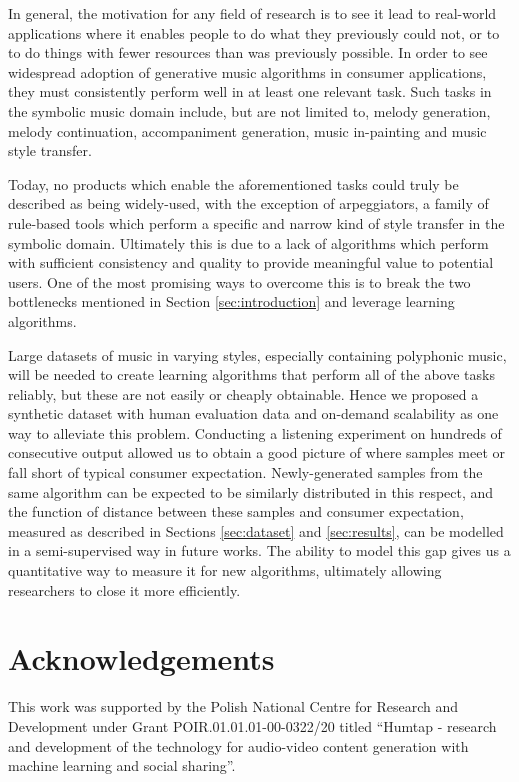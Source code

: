 \documentclass{article}
\begin{document}
In general, the motivation for any field of research is to see it lead to real-world applications where it enables people to do what they previously could not, or to to do things with fewer resources than was previously possible. In order to see widespread adoption of generative music algorithms in consumer applications, they must consistently perform well in at least one relevant task. Such tasks in the symbolic music domain include, but are not limited to, melody generation, melody continuation, accompaniment generation, music in-painting and music style transfer. 

Today, no products which enable the aforementioned tasks could truly be described as being widely-used, with the exception of arpeggiators, a family of rule-based tools which perform a specific and narrow kind of style transfer in the symbolic domain. Ultimately this is due to a lack of algorithms which perform with sufficient consistency and quality to provide meaningful value to potential users. One of the most promising ways to overcome this is to break the two bottlenecks mentioned in Section \ref{sec:introduction} and leverage learning algorithms.

Large datasets of music in varying styles, especially containing polyphonic music, will be needed to create learning algorithms that perform all of the above tasks reliably, but these are not easily or cheaply obtainable. Hence we proposed a synthetic dataset with human evaluation data and on-demand scalability as one way to alleviate this problem. Conducting a listening experiment on hundreds of consecutive output allowed us to obtain a good picture of where samples meet or fall short of typical consumer expectation. Newly-generated samples from the same algorithm can be expected to be similarly distributed in this respect, and the function of distance between these samples and consumer expectation, measured as described in Sections \ref{sec:dataset} and \ref{sec:results}, can be modelled in a semi-supervised way in future works. The ability to model this gap gives us a quantitative way to measure it for new algorithms, ultimately allowing researchers to close it more efficiently.

\section{Acknowledgements}

This work was supported by the Polish National Centre for Research and Development under Grant POIR.01.01.01-00-0322/20 titled “Humtap - research and development of the technology for audio-video content generation with machine learning and social sharing”.


\end{document}
